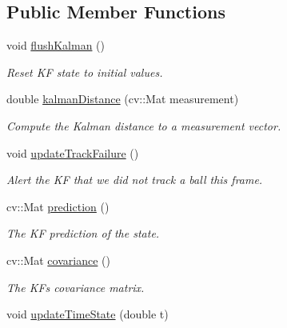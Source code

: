 \subsection*{Public Member Functions}
\begin{DoxyCompactItemize}
\item 
void \hyperlink{classTrackingFilter_a27439ec9b02d78bf1850ba74205989a4}{flush\+Kalman} ()\hypertarget{classTrackingFilter_a27439ec9b02d78bf1850ba74205989a4}{}\label{classTrackingFilter_a27439ec9b02d78bf1850ba74205989a4}

\begin{DoxyCompactList}\small\item\em Reset KF state to initial values. \end{DoxyCompactList}\item 
double \hyperlink{classTrackingFilter_a8dff413c938e6d139f079f0c10540647}{kalman\+Distance} (cv\+::\+Mat measurement)
\begin{DoxyCompactList}\small\item\em Compute the Kalman distance to a measurement vector. \end{DoxyCompactList}\item 
void \hyperlink{classTrackingFilter_a1116b384519eb6b05020e192dee500f7}{update\+Track\+Failure} ()\hypertarget{classTrackingFilter_a1116b384519eb6b05020e192dee500f7}{}\label{classTrackingFilter_a1116b384519eb6b05020e192dee500f7}

\begin{DoxyCompactList}\small\item\em Alert the KF that we did not track a ball this frame. \end{DoxyCompactList}\item 
cv\+::\+Mat \hyperlink{classTrackingFilter_a0bd9fd846ed2fd6255f2bcabc5bfa0fe}{prediction} ()\hypertarget{classTrackingFilter_a0bd9fd846ed2fd6255f2bcabc5bfa0fe}{}\label{classTrackingFilter_a0bd9fd846ed2fd6255f2bcabc5bfa0fe}

\begin{DoxyCompactList}\small\item\em The KF prediction of the state. \end{DoxyCompactList}\item 
cv\+::\+Mat \hyperlink{classTrackingFilter_a0088316527eca5efdd3deac5f9dcf061}{covariance} ()\hypertarget{classTrackingFilter_a0088316527eca5efdd3deac5f9dcf061}{}\label{classTrackingFilter_a0088316527eca5efdd3deac5f9dcf061}

\begin{DoxyCompactList}\small\item\em The KF\textquotesingle{}s covariance matrix. \end{DoxyCompactList}\item 
void \hyperlink{classTrackingFilter_aefd8f259d45dd728eb32addf48799026}{update\+Time\+State} (double t)\hypertarget{classTrackingFilter_aefd8f259d45dd728eb32addf48799026}{}\label{classTrackingFilter_aefd8f259d45dd728eb32addf48799026}


\end{DoxyCompactItemize}
